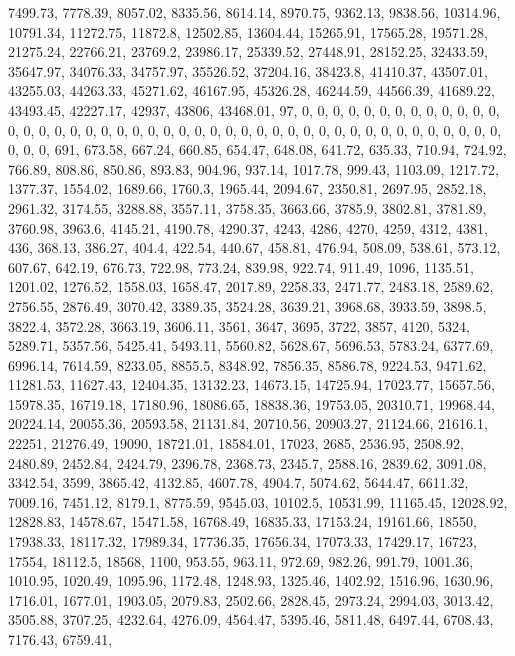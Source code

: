 \documentclass[
]{article}
\begin{document}
7499.73, 7778.39, 8057.02, 8335.56, 8614.14, 8970.75, 9362.13, 9838.56,
10314.96, 10791.34, 11272.75, 11872.8, 12502.85, 13604.44, 15265.91,
17565.28, 19571.28, 21275.24, 22766.21, 23769.2, 23986.17, 25339.52,
27448.91, 28152.25, 32433.59, 35647.97, 34076.33, 34757.97, 35526.52,
37204.16, 38423.8, 41410.37, 43507.01, 43255.03, 44263.33, 45271.62,
46167.95, 45326.28, 46244.59, 44566.39, 41689.22, 43493.45, 42227.17,
42937, 43806, 43468.01, 97, 0, 0, 0, 0, 0, 0, 0, 0, 0, 0, 0, 0, 0, 0, 0,
0, 0, 0, 0, 0, 0, 0, 0, 0, 0, 0, 0, 0, 0, 0, 0, 0, 0, 0, 0, 0, 0, 0, 0,
0, 0, 0, 0, 0, 0, 0, 0, 0, 691, 673.58, 667.24, 660.85, 654.47, 648.08,
641.72, 635.33, 710.94, 724.92, 766.89, 808.86, 850.86, 893.83, 904.96,
937.14, 1017.78, 999.43, 1103.09, 1217.72, 1377.37, 1554.02, 1689.66,
1760.3, 1965.44, 2094.67, 2350.81, 2697.95, 2852.18, 2961.32, 3174.55,
3288.88, 3557.11, 3758.35, 3663.66, 3785.9, 3802.81, 3781.89, 3760.98,
3963.6, 4145.21, 4190.78, 4290.37, 4243, 4286, 4270, 4259, 4312, 4381,
436, 368.13, 386.27, 404.4, 422.54, 440.67, 458.81, 476.94, 508.09,
538.61, 573.12, 607.67, 642.19, 676.73, 722.98, 773.24, 839.98, 922.74,
911.49, 1096, 1135.51, 1201.02, 1276.52, 1558.03, 1658.47, 2017.89,
2258.33, 2471.77, 2483.18, 2589.62, 2756.55, 2876.49, 3070.42, 3389.35,
3524.28, 3639.21, 3968.68, 3933.59, 3898.5, 3822.4, 3572.28, 3663.19,
3606.11, 3561, 3647, 3695, 3722, 3857, 4120, 5324, 5289.71, 5357.56,
5425.41, 5493.11, 5560.82, 5628.67, 5696.53, 5783.24, 6377.69, 6996.14,
7614.59, 8233.05, 8855.5, 8348.92, 7856.35, 8586.78, 9224.53, 9471.62,
11281.53, 11627.43, 12404.35, 13132.23, 14673.15, 14725.94, 17023.77,
15657.56, 15978.35, 16719.18, 17180.96, 18086.65, 18838.36, 19753.05,
20310.71, 19968.44, 20224.14, 20055.36, 20593.58, 21131.84, 20710.56,
20903.27, 21124.66, 21616.1, 22251, 21276.49, 19090, 18721.01, 18584.01,
17023, 2685, 2536.95, 2508.92, 2480.89, 2452.84, 2424.79, 2396.78,
2368.73, 2345.7, 2588.16, 2839.62, 3091.08, 3342.54, 3599, 3865.42,
4132.85, 4607.78, 4904.7, 5074.62, 5644.47, 6611.32, 7009.16, 7451.12,
8179.1, 8775.59, 9545.03, 10102.5, 10531.99, 11165.45, 12028.92,
12828.83, 14578.67, 15471.58, 16768.49, 16835.33, 17153.24, 19161.66,
18550, 17938.33, 18117.32, 17989.34, 17736.35, 17656.34, 17073.33,
17429.17, 16723, 17554, 18112.5, 18568, 1100, 953.55, 963.11, 972.69,
982.26, 991.79, 1001.36, 1010.95, 1020.49, 1095.96, 1172.48, 1248.93,
1325.46, 1402.92, 1516.96, 1630.96, 1716.01, 1677.01, 1903.05, 2079.83,
2502.66, 2828.45, 2973.24, 2994.03, 3013.42, 3505.88, 3707.25, 4232.64,
4276.09, 4564.47, 5395.46, 5811.48, 6497.44, 6708.43, 7176.43, 6759.41,
\end{document}
